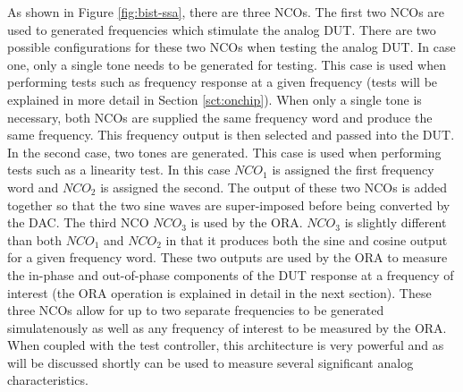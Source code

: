 \documentclass[12pt]{report}
\begin{document}
As shown in Figure \ref{fig:bist-ssa}, there are three NCOs.  The first two NCOs are used to generated frequencies which stimulate the analog DUT.  There are two possible configurations for these two NCOs when testing the analog DUT.  In case one, only a single tone needs to be generated for testing.  This case is used when performing tests such as frequency response at a given frequency (tests will be explained in more detail in Section \ref{sct:onchip}).  When only a single tone is necessary, both NCOs are supplied the same frequency word and produce the same frequency.  This frequency output is then selected and passed into the DUT.  In the second case, two tones are generated.  This case is used when performing tests such as a linearity test.  In this case $NCO_1$ is assigned the first frequency word and $NCO_2$ is assigned the second.  The output of these two NCOs is added together so that the two sine waves are super-imposed before being converted by the DAC\cite{jie}.  The third NCO $NCO_3$ is used by the ORA.  $NCO_3$ is slightly different than both $NCO_1$ and $NCO_2$ in that it produces both the sine and cosine output for a given frequency word.  These two outputs are used by the ORA to measure the in-phase and out-of-phase components of the DUT response at a frequency of interest (the ORA operation is explained in detail in the next section)\cite{jie}.   These three NCOs allow for up to two separate frequencies to be generated simulatenously as well as any frequency of interest to be measured by the ORA.  When coupled with the test controller, this architecture is very powerful and as will be discussed shortly can be used to measure several significant analog characteristics.
\end{document}
